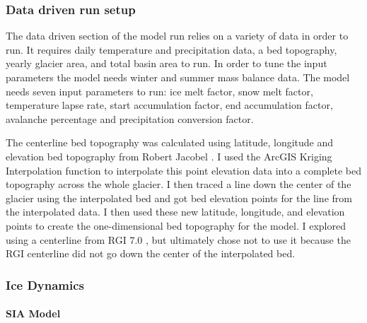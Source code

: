 \documentclass{article}
\begin{document}


\subsubsection{Data driven run setup}
The data driven section of the model run relies on a variety of data in order to run. It requires daily temperature and precipitation data, 
a bed topography, yearly glacier area, and total basin area to run. In order to tune the input parameters the model needs winter and summer mass balance 
data. The model needs seven input parameters to run: ice melt factor, snow melt factor, temperature lapse rate, start accumulation factor, end 
accumulation factor, avalanche percentage and precipitation conversion factor. 

The centerline bed topography was calculated using latitude, longitude and elevation bed topography from Robert Jacobel \cite{ref4}. 
 I used the ArcGIS Kriging Interpolation function \cite{ref5} to interpolate this point elevation data into a complete 
bed topography across the whole glacier. I then traced a line down the center of the glacier using the interpolated bed and got bed elevation points for the line 
from the interpolated data. I then used these new latitude, longitude, and elevation points to create the one-dimensional bed topography for 
the model. I explored using a centerline from RGI 7.0 \cite{ref6}, but ultimately chose not to use it because the RGI centerline did not go 
down the center of the interpolated bed.

\subsubsection{Ice Dynamics}
\paragraph{SIA Model}
\end{document}
